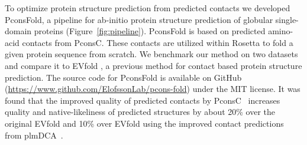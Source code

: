\documentclass{bioinfo}
\begin{document}
To optimize protein structure prediction from predicted contacts we
developed PconsFold, a pipeline for ab-initio protein structure
prediction of globular single-domain proteins
(Figure~\ref{fig:pipeline}). PconsFold is based on predicted
amino-acid contacts from PconsC. These contacts are utilized within
Rosetta to fold a given protein sequence from scratch. We benchmark
our method on two datasets and compare it to EVfold
\cite[]{marks_protein_2011}, a previous method for contact based
protein structure prediction. The source code for PconsFold is
available on GitHub
(\url{https://www.github.com/ElofssonLab/pcons-fold}) under the MIT
license. It was found that the improved quality of predicted contacts
by PconsC~\cite{skwark_PconsC:_2013} increases quality and
native-likeliness of predicted structures by about 20\% over the
original EVfold and 10\% over EVfold using the improved contact
predictions from plmDCA~\cite{ekeberg_improved_2013}.
\end{document}

